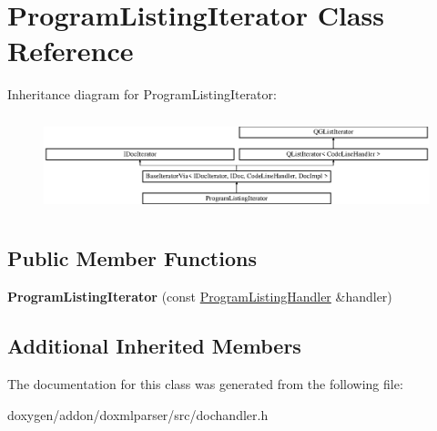 \hypertarget{class_program_listing_iterator}{}\section{Program\+Listing\+Iterator Class Reference}
\label{class_program_listing_iterator}
Inheritance diagram for Program\+Listing\+Iterator\+:\begin{figure}[H]
\begin{center}
\leavevmode
\includegraphics[height=2.842639cm]{class_program_listing_iterator}
\end{center}
\end{figure}
\subsection*{Public Member Functions}
\begin{DoxyCompactItemize}
\item 
\mbox{\label{class_program_listing_iterator_a96bb440a763c355698c61a9e3b6ce05c}} 
{\bfseries Program\+Listing\+Iterator} (const \mbox{\hyperlink{class_program_listing_handler}{Program\+Listing\+Handler}} \&handler)
\end{DoxyCompactItemize}
\subsection*{Additional Inherited Members}


The documentation for this class was generated from the following file\+:\begin{DoxyCompactItemize}
\item 
doxygen/addon/doxmlparser/src/dochandler.\+h\end{DoxyCompactItemize}
